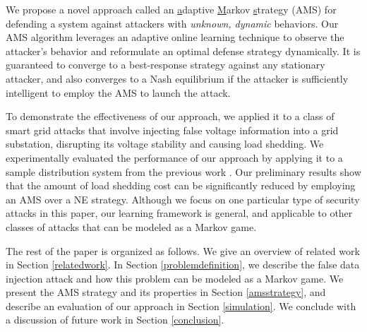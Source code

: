 We propose a novel approach called an \underline{a}daptive \underline{M}arkov \underline{s}trategy (AMS) for defending a system against attackers with \emph{unknown, dynamic} behaviors. Our AMS algorithm leverages an adaptive online learning technique to observe the attacker's behavior and reformulate an optimal defense strategy dynamically. It is guaranteed to converge to a best-response strategy against any stationary attacker, and also converges to a Nash equilibrium if the attacker is sufficiently intelligent to employ the AMS to launch the attack.

To demonstrate the effectiveness of our approach, we applied it to a class of smart grid attacks that involve injecting false voltage information into a grid substation, disrupting its voltage stability and causing load shedding. We experimentally evaluated the performance of our approach by applying it to a sample distribution system from the previous work \cite{law2012security}. Our preliminary results show that the amount of load shedding cost can be significantly reduced by employing an AMS over a NE strategy. Although we focus on one particular type of security attacks in this paper, our learning framework is general, and applicable to other classes of attacks that can be modeled as a Markov game.

The rest of the paper is organized as follows. We give an overview of related work in Section \ref{relatedwork}. In Section \ref{problemdefinition}, we describe the false data injection attack and how this problem can be modeled as a Markov game. We present the AMS strategy and its properties in Section \ref{amsstrategy}, and describe an evaluation of our approach in Section \ref{simulation}. We conclude with a discussion of future work in Section \ref{conclusion}.
